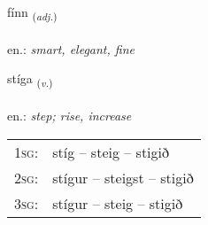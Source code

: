 \documentclass[frontgrid, backgrid]{flacards}\usepackage[]{graphicx}\usepackage[]{xcolor}
\begin{document}
\renewcommand{\flhead}{\vskip5pt \fboxsep=0pt {\small\bfseries\footnotesize Lýsingarorð | Adjective}}
\renewcommand{\fcfoot}{\vskip5pt \fboxsep=0pt \hspace{2pt}{\small\bfseries\footnotesize 2K}}

\renewcommand{\blhead}{\vskip5pt {\small\bfseries\footnotesize Lýsingarorð | Adjective }}
\renewcommand{\bcfoot}{\vskip5pt \hspace{2pt}{\small\bfseries\footnotesize 2K}}


{fínn \small{\textsubscript{(\textit{adj.})}} \\[1ex] %
\textphonetic{[fitn̥]} \\
en.: \emph{smart, elegant, fine} \\  [2ex]
\renewcommand*{\arraystretch}{0.8}
}

\renewcommand{\flhead}{\vskip5pt \fboxsep=0pt {\small\bfseries\footnotesize Sagnorð | Verb}}
\renewcommand{\fcfoot}{\vskip5pt \fboxsep=0pt \hspace{2pt}{\small\bfseries\footnotesize 2K}}

\renewcommand{\blhead}{\vskip5pt {\small\bfseries\footnotesize Sagnorð | Verb }}
\renewcommand{\bcfoot}{\vskip5pt \hspace{2pt}{\small\bfseries\footnotesize 2K}}


{stíga \small{\textsubscript{(\textit{v.})}} \\[1ex] %
\textphonetic{[stiːɣa]} \\
en.: \emph{step; rise, increase} \\  [2ex]
\renewcommand*{\arraystretch}{0.8}
\begin{tabular}{p{1cm}l}
\textsc{1sg}: & stíg -- steig -- stigið \\ 
\textsc{2sg}: & stígur -- steigst -- stigið \\ 
\textsc{3sg}: & stígur -- steig -- stigið \\ 
\end{tabular}
}
\end{document}
